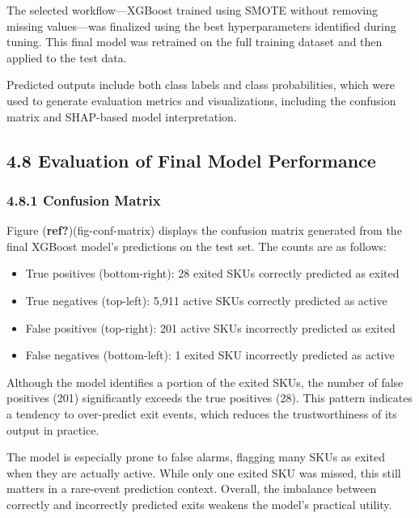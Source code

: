 \documentclass[
  letterpaper,
  DIV=11,
  numbers=noendperiod]{scrartcl}
\providecommand{\tightlist}{%
  \setlength{\itemsep}{0pt}\setlength{\parskip}{0pt}}\usepackage{longtable,booktabs,array}
\begin{document}
The selected workflow---XGBoost trained using SMOTE without removing
missing values---was finalized using the best hyperparameters identified
during tuning. This final model was retrained on the full training
dataset and then applied to the test data.

Predicted outputs include both class labels and class probabilities,
which were used to generate evaluation metrics and visualizations,
including the confusion matrix and SHAP-based model interpretation.

\subsection{4.8 Evaluation of Final Model
Performance}\label{evaluation-of-final-model-performance}

\subsubsection{4.8.1 Confusion Matrix}\label{confusion-matrix}

Figure (\textbf{ref?})(fig-conf-matrix) displays the confusion matrix
generated from the final XGBoost model's predictions on the test set.
The counts are as follows:

\begin{itemize}
\tightlist
\item
  True positives (bottom-right): 28 exited SKUs correctly predicted as
  exited
\item
  True negatives (top-left): 5,911 active SKUs correctly predicted as
  active
\item
  False positives (top-right): 201 active SKUs incorrectly predicted as
  exited
\item
  False negatives (bottom-left): 1 exited SKU incorrectly predicted as
  active
\end{itemize}

Although the model identifies a portion of the exited SKUs, the number
of false positives (201) significantly exceeds the true positives (28).
This pattern indicates a tendency to over-predict exit events, which
reduces the trustworthiness of its output in practice.

The model is especially prone to false alarms, flagging many SKUs as
exited when they are actually active. While only one exited SKU was
missed, this still matters in a rare-event prediction context. Overall,
the imbalance between correctly and incorrectly predicted exits weakens
the model's practical utility.
\end{document}
